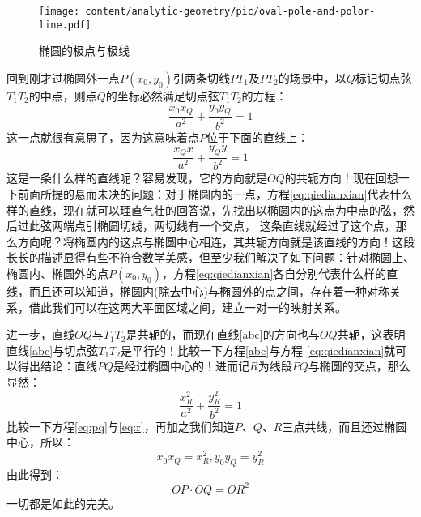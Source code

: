 \begin{figure}[htbp]
  \centering
\texttt{[image: content/analytic-geometry/pic/oval-pole-and-polor-line.pdf]}
\caption{椭圆的极点与极线}
\label{fig:oval-pole-and-polor-line}
\end{figure}

回到刚才过椭圆外一点$P(x_0,y_0)$引两条切线$PT_1$及$PT_2$的场景中，以$Q$标记切点弦$T_1T_2$的中点，则点$Q$的坐标必然满足切点弦$T_1T_2$的方程：
\begin{equation}
\frac{x_0 x_Q}{a^2}+\frac{y_0 y_Q}{b^2} = 1 \label{eq:pq}
\end{equation}
这一点就很有意思了，因为这意味着点$P$位于下面的直线上：
\begin{equation}
\frac{x_Q x}{a^2}+\frac{y_Q y}{b^2} = 1 \label{abc}
\end{equation}
这是一条什么样的直线呢？容易发现，它的方向就是$OQ$的共轭方向！现在回想一下前面所提的悬而未决的问题：对于椭圆内的一点，方程\ref{eq:qiedianxian}代表什么样的直线，现在就可以理直气壮的回答说，先找出以椭圆内的这点为中点的弦，然后过此弦两端点引椭圆切线，两切线有一个交点，
这条直线就经过了这个点，那么方向呢？将椭圆内的这点与椭圆中心相连，其共轭方向就是该直线的方向！这段长长的描述显得有些不符合数学美感，但至少我们解决了如下问题：针对椭圆上、椭圆内、椭圆外的点$P(x_0,y_0)$，方程\ref{eq:qiedianxian}各自分别代表什么样的直线，而且还可以知道，椭圆内(除去中心)与椭圆外的点之间，存在着一种对称关系，借此我们可以在这两大平面区域之间，建立一对一的映射关系。

进一步，直线$OQ$与$T_1T_2$是共轭的，而现在直线\ref{abc}的方向也与$OQ$共轭，这表明直线\ref{abc}与切点弦$T_1T_2$是平行的！比较一下方程\ref{abc}与方程
\ref{eq:qiedianxian}就可以得出结论：直线$PQ$是经过椭圆中心的！进而记$R$为线段$PQ$与椭圆的交点，那么显然：
\begin{equation}
\frac{x_R^2}{a^2}+\frac{y_R^2}{b^2}=1 \label{eq:r}
\end{equation}
比较一下方程\ref{eq:pq}与\ref{eq:r}，再加之我们知道$P$、$Q$、$R$三点共线，而且还过椭圆中心，所以：
\begin{equation}
x_0 x_Q=x_R^2,y_0 y_Q=y_R^2
\end{equation}
由此得到：
\begin{equation}
OP\cdot OQ = OR^2
\end{equation}
一切都是如此的完美。

